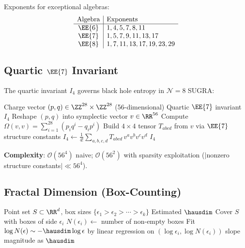 Exponents for exceptional algebras:
\begin{equation}
\begin{array}{c|l}
\text{Algebra} & \text{Exponents} \\
\hline
\EE{6} & 1, 4, 5, 7, 8, 11 \\
\EE{7} & 1, 5, 7, 9, 11, 13, 17 \\
\EE{8} & 1, 7, 11, 13, 17, 19, 23, 29 \\
\end{array}
\end{equation}

\subsection{Quartic $\EE{7}$ Invariant}

The quartic invariant $I_4$ governs black hole entropy in
$\mathcal{N}=8$ SUGRA:

\begin{algorithm}[H]
\caption{Quartic $\EE{7}$ Invariant $I_4(p,q)$}
\label{alg:e7_invariant}
\begin{algorithmic}[1]
\Require Charge vector $(p, q) \in \ZZ^{28} \times \ZZ^{28}$
    (56-dimensional)
\Ensure Quartic $\EE{7}$ invariant $I_4$
\State Reshape $(p,q)$ into symplectic vector $v \in \RR^{56}$
\State Compute $\Omega(v,v) = \sum_{i=1}^{28} (p_i q^i - q_i p^i)$
\State Build $4 \times 4$ tensor $T_{abcd}$ from $v$ via $\EE{7}$
    structure constants
\State $I_4 \gets \frac{1}{4!}\sum_{a,b,c,d} T_{abcd}\, v^a v^b v^c v^d$
\State \Return $I_4$
\end{algorithmic}
\end{algorithm}

\textbf{Complexity}: $\mathcal{O}(56^4)$ naive; $\mathcal{O}(56^2)$ with
sparsity exploitation ($|$nonzero structure constants$| \ll 56^4$).

\subsection{Fractal Dimension (Box-Counting)}

\begin{algorithm}[H]
\caption{Box-Counting Hausdorff Dimension}
\label{alg:box_counting}
\begin{algorithmic}[1]
\Require Point set $S \subset \RR^d$, box sizes
    $\{\epsilon_1 > \epsilon_2 > \cdots > \epsilon_k\}$
\Ensure Estimated $\hausdim$
    \State Cover $S$ with boxes of side $\epsilon_i$
    \State $N(\epsilon_i) \gets$ number of non-empty boxes
\EndFor
\State Fit $\log N(\epsilon) \sim -\hausdim \log \epsilon$ by linear
    regression on $({\log \epsilon_i}, {\log N(\epsilon_i)})$
\State \Return slope magnitude as $\hausdim$
\end{algorithmic}
\end{algorithm}

